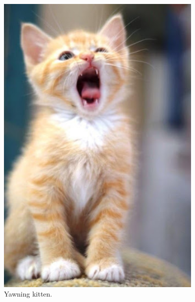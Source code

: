 \documentclass{article}
\begin{document}
\begin{figure}[htp]
    \centering
    \includegraphics[width=10cm]{unnamed.jpg}
    \caption{Yawning kitten.}
    \label{fig:kitten2}
\end{figure}
\end{document}
